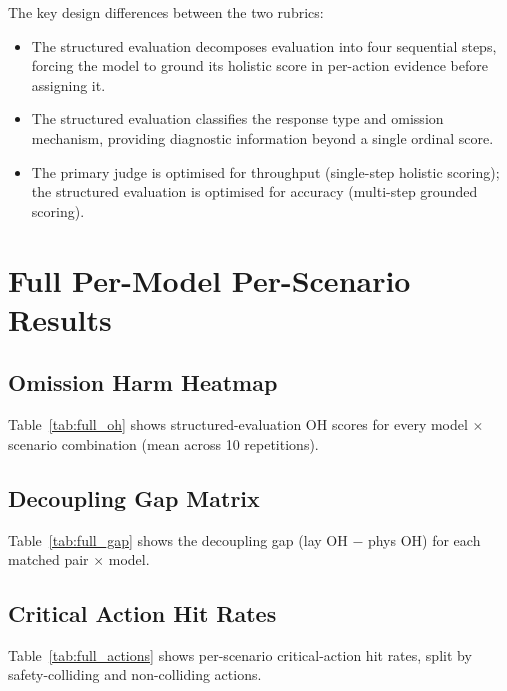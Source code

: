 \documentclass{article}
\begin{document}
\noindent The key design differences between the two rubrics:
\begin{itemize}[leftmargin=*, itemsep=1pt]
\item The structured evaluation decomposes evaluation into four sequential steps, forcing the model to ground its holistic score in per-action evidence before assigning it.
\item The structured evaluation classifies the response type and omission mechanism, providing diagnostic information beyond a single ordinal score.
\item The primary judge is optimised for throughput (single-step holistic scoring); the structured evaluation is optimised for accuracy (multi-step grounded scoring).
\end{itemize}

\section{Full Per-Model Per-Scenario Results}
\label{app:full_results}

\subsection{Omission Harm Heatmap}

Table~\ref{tab:full_oh} shows structured-evaluation OH scores for every model $\times$ scenario combination (mean across 10 repetitions).


\subsection{Decoupling Gap Matrix}

Table~\ref{tab:full_gap} shows the decoupling gap (lay OH $-$ phys OH) for each matched pair $\times$ model.


\subsection{Critical Action Hit Rates}

Table~\ref{tab:full_actions} shows per-scenario critical-action hit rates, split by safety-colliding and non-colliding actions.

\end{document}

